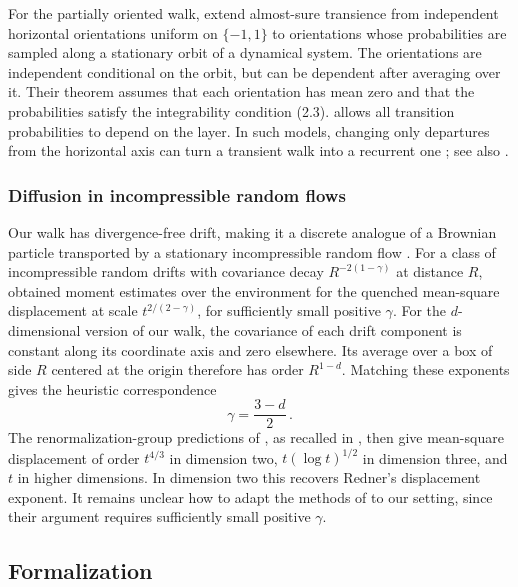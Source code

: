 \documentclass[11pt]{amsart}
\theoremstyle{plain}
\theoremstyle{definition}
\newcommand{\1}{\mathbf 1}
\begin{document}
	For the partially oriented walk, \citet*[Theorem~1]{GLN08T} extend almost-sure transience from independent
	horizontal orientations uniform on $\{-1,1\}$ to orientations whose
	probabilities are sampled along a stationary orbit of a dynamical system.  The orientations
	are independent conditional on the orbit, but can be dependent after
	averaging over it.  Their theorem assumes that each orientation has
	mean zero and that the probabilities satisfy the integrability
	condition (2.3).  \citet*{Bre17} allows all transition
	probabilities to depend on the layer.  In such models, changing only
	departures from the horizontal axis can turn a transient walk into
	a recurrent one \citep*[Corollary~2.6]{BHP22}; see
	also \citet*[Proposition~7.8]{Bre17}.
	
	\subsubsection{Diffusion in incompressible random flows}
	\label{sssec:divfree}
	
	Our walk has divergence-free drift, making it a discrete analogue of a
	Brownian particle transported by a stationary incompressible random flow
	\citep*{BGKPR90}.  For a class of incompressible random drifts with covariance
	decay $R^{-2(1-\gamma)}$ at distance $R$, \citet*{ABK26} obtained moment
	estimates over the environment for the quenched mean-square displacement
	at scale $t^{2/(2-\gamma)}$, for sufficiently small positive $\gamma$.
	For the $d$-dimensional version of our walk, the covariance of each drift
	component is constant along its coordinate axis and zero elsewhere.
	Its average over a box of side $R$ centered at the origin therefore has
	order $R^{1-d}$.
	Matching these exponents gives the heuristic correspondence
	\begin{equation}\label{eq:gamma-dimension}
		\gamma=\frac{3-d}{2}\, .
	\end{equation}
	The renormalization-group predictions of \citet*{BG90}, as recalled in
	\citet*{ABK26}, then give mean-square displacement of order $t^{4/3}$ in
	dimension two, $t(\log t)^{1/2}$ in dimension three, and $t$ in higher
	dimensions.  In dimension two this recovers Redner's displacement exponent.
	It remains unclear how to adapt the methods of \citet*{ABK26} to our
	setting, since their argument requires sufficiently small positive $\gamma$.

	\subsection{Formalization}\label{ssec:formalization}
	
\end{document}
